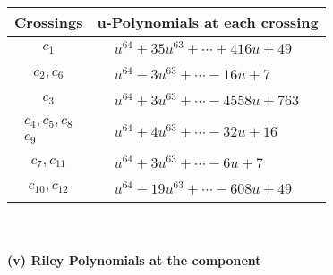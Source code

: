 \documentclass[1p]{elsarticle_modified}
\theoremstyle{definition}
\begin{document}
\begin{tabular}{m{50pt}|m{274pt}}
Crossings & \hspace{64pt}u-Polynomials at each crossing \\
\hline $$\begin{aligned}c_{1}\end{aligned}$$&$\begin{aligned}
&u^{64}+35 u^{63}+\cdots+416 u+49
\end{aligned}$\\
\hline $$\begin{aligned}c_{2},c_{6}\end{aligned}$$&$\begin{aligned}
&u^{64}-3 u^{63}+\cdots-16 u+7
\end{aligned}$\\
\hline $$\begin{aligned}c_{3}\end{aligned}$$&$\begin{aligned}
&u^{64}+3 u^{63}+\cdots-4558 u+763
\end{aligned}$\\
\hline $$\begin{aligned}c_{4},c_{5},c_{8}\\c_{9}\end{aligned}$$&$\begin{aligned}
&u^{64}+4 u^{63}+\cdots-32 u+16
\end{aligned}$\\
\hline $$\begin{aligned}c_{7},c_{11}\end{aligned}$$&$\begin{aligned}
&u^{64}+3 u^{63}+\cdots-6 u+7
\end{aligned}$\\
\hline $$\begin{aligned}c_{10},c_{12}\end{aligned}$$&$\begin{aligned}
&u^{64}-19 u^{63}+\cdots-608 u+49
\end{aligned}$\\
\hline
\end{tabular}\\~\\
\newpage\renewcommand{\arraystretch}{1}
\flushleft \textbf{(v) Riley Polynomials at the component}\newline \\
\end{document}

